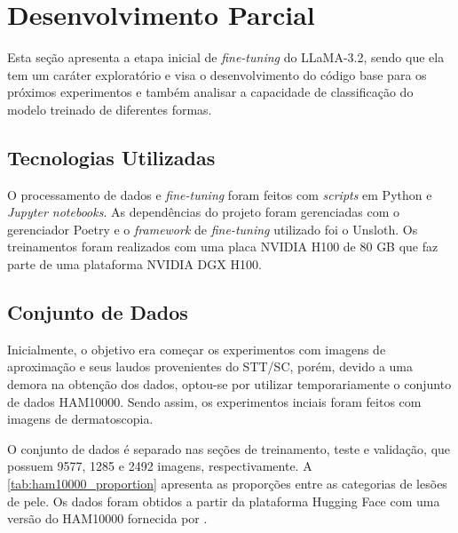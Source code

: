 \chapter{Desenvolvimento Parcial} %

Esta seção apresenta a etapa inicial de \textit{fine-tuning} do \ac{LLaMA}-3.2, sendo que ela tem um caráter exploratório e visa o desenvolvimento do código base para
os próximos experimentos e também analisar a capacidade de classificação do modelo treinado de diferentes formas.

\section{Tecnologias Utilizadas}

O processamento de dados e \textit{fine-tuning} foram feitos com \textit{scripts} em Python e \textit{Jupyter notebooks}. As dependências do projeto foram gerenciadas
com o gerenciador Poetry e o \textit{framework} de \textit{fine-tuning} utilizado foi o Unsloth. Os treinamentos foram realizados com uma placa NVIDIA H100 de 80 GB que
faz parte de uma plataforma NVIDIA DGX H100.

\section{Conjunto de Dados}

Inicialmente, o objetivo era começar os experimentos com imagens de aproximação e seus laudos provenientes do \ac{STT/SC}, porém, devido a uma demora na obtenção dos
dados, optou-se por utilizar temporariamente o conjunto de dados \ac{HAM10000}. Sendo assim, os experimentos inciais foram feitos com imagens de dermatoscopia.

O conjunto de dados é separado nas seções de treinamento, teste e validação, que possuem 9577, 1285 e 2492 imagens, respectivamente. A \autoref{tab:ham10000_proportion}
apresenta as proporções entre as categorias de lesões de pele. Os dados foram obtidos a partir da plataforma Hugging Face com uma versão do \ac{HAM10000} fornecida por
\textcite{skin_cancer_dataset}.

